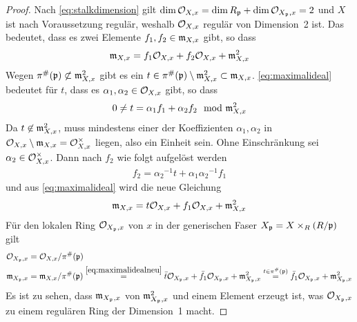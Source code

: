 \begin{Lemma}
\begin{proof}
    Nach \autoref{eq:stalkdimension} gilt
    ${\dim\mathcal{O}_{X,x}=\dim R_{\mathfrak{p}}+\dim\mathcal{O}_{X_{\mathfrak{p}},x}=2}$ und $X$ ist nach
    Voraussetzung regulär, weshalb $\mathcal{O}_{X,x}$ regulär von Dimension~2
    ist. Das bedeutet, dass es zwei Elemente $f_1, {f_2\in\mathfrak{m}_{X,x}}$
    gibt, so dass
    \begin{gather}\label{eq:maximalideal}
      \mathfrak{m}_{X,x} = f_1\mathcal{O}_{X,x} + f_2\mathcal{O}_{X,x} + \mathfrak{m}_{X,x}^2
    \end{gather}
    Wegen ${\pi^\#(\mathfrak{p})\not\subset\mathfrak{m}_{X,x}^2}$ gibt es ein
    ${t\in\pi^\#(\mathfrak{p})\setminus\mathfrak{m}_{X,x}^2\subset\mathfrak{m}_{X,x}}$.
    \eqref{eq:maximalideal} bedeutet für $t$, dass es $\alpha_1,
    {\alpha_2\in\mathcal{O}_{X,x}}$ gibt, so dass
    \begin{gather*}
      0 \neq t = \alpha_1 f_1 + \alpha_2 f_2 \mod {\mathfrak{m}}_{X,x}^2
    \end{gather*}
    Da $t\not\in\mathfrak{m}_{X,x}^2$, muss mindestens einer der Koeffizienten
    $\alpha_1,\alpha_2$ in $\mathcal{O}_{X,x}\setminus\mathfrak{m}_{X,x}=\mathcal{O}_{X,x}^\times$
    liegen, also ein Einheit sein. Ohne Einschränkung sei
    $\alpha_2\in\mathcal{O}_{X,x}^\times$. Dann nach $f_2$ wie folgt
    aufgelöst werden
    \begin{gather*}
      f_2 = {\alpha_2}^{-1}t + {\alpha_1}{\alpha_2}^{-1}f_1 
    \end{gather*}
    und aus \eqref{eq:maximalideal} wird die neue Gleichung
    \begin{gather}\label{eq:maximalidealneu}
      \mathfrak{m}_{X,x} = t\mathcal{O}_{X,x} + f_1\mathcal{O}_{X,x} + \mathfrak{m}_{X,x}^2
    \end{gather}
    Für den lokalen Ring $\mathcal{O}_{X_{\mathfrak{p}},x}$ von $x$ in der generischen
    Faser ${X_{\mathfrak{p}} = X\times_R (R/\mathfrak{p})}$ gilt
    \begin{align*}
      \mathcal{O}_{X_{\mathfrak{p}},x} &= \mathcal{O}_{X,x}/\pi^\#(\mathfrak{p})\\
      \mathfrak{m}_{X_{\mathfrak{p}},x} &= \mathfrak{m}_{X,x}/\pi^\#(\mathfrak{p})
                    \overset{\eqref{eq:maximalidealneu}}{=}
                    \bar t\mathcal{O}_{X_{\mathfrak{p}},x} + \bar f_1\mathcal{O}_{X_{\mathfrak{p}},x} +
                    \mathfrak{m}_{X_{\mathfrak{p}},x}^2
                    \overset{t\in\pi^\#(\mathfrak{p})}{=}
                    \bar f_1\mathcal{O}_{X_{\mathfrak{p}},x} + \mathfrak{m}_{X_{\mathfrak{p}},x}^2 
    \end{align*}
    Es ist zu sehen, dass $\mathfrak{m}_{X_{\mathfrak{p}},x}$ von $\mathfrak{m}_{X_{\mathfrak{p}},x}^2$ und einem Element
    erzeugt ist, was $\mathcal{O}_{X_{\mathfrak{p}},x}$ zu einem regulären Ring der Dimension~1
    macht.
  \end{proof}
\end{Lemma}

